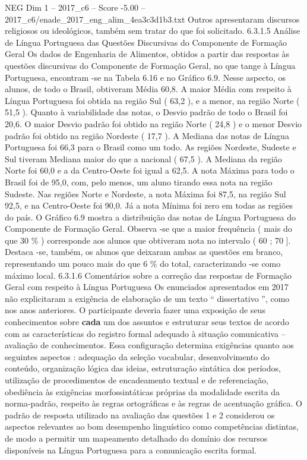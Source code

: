 \begin{textsample}{NEG Dim 1 – 2017\_c6 – Score -5.00 – 2017\_c6/enade\_2017\_eng\_alim\_4ea3c3d1b3.txt}
Outros apresentaram discursos religiosos ou ideológicos, também sem tratar do que foi solicitado. 6.3.1.5 Análise de Língua Portuguesa das Questões Discursivas do Componente de Formação Geral Os dados de Engenharia de Alimentos, obtidos a partir das respostas às questões discursivas do Componente de Formação Geral, no que tange à Língua Portuguesa, encontram -se na Tabela 6.16 e no Gráfico 6.9.
Nesse aspecto, os alunos, de todo o Brasil, obtiveram Média 60,8.
A maior Média com respeito à Língua Portuguesa foi obtida na região Sul ( 63,2 ), e a menor, na região Norte ( 51,5 ).
Quanto à variabilidade das notas, o Desvio padrão de todo o Brasil foi 20,6.
O maior Desvio padrão foi obtido na região Norte ( 24,8 ) e o menor Desvio padrão foi obtido na região Nordeste ( 17,7 ).
A Mediana das notas de Língua Portuguesa foi 66,3 para o Brasil como um todo.
As regiões Nordeste, Sudeste e Sul tiveram Mediana maior do que a nacional ( 67,5 ).
A Mediana da região Norte foi 60,0 e a da Centro-Oeste foi igual a 62,5.
A nota Máxima para todo o Brasil foi de 95,0, com, pelo menos, um aluno tirando essa nota na região Sudeste.
Nas regiões Norte e Nordeste, a nota Máxima foi 87,5, na região Sul 92,5, e na Centro-Oeste foi 90,0.
Já a nota Mínima foi zero em todas as regiões do país.
O Gráfico 6.9 mostra a distribuição das notas de Língua Portuguesa do Componente de Formação Geral.
Observa -se que a maior frequência ( mais do que 30 \% ) corresponde aos alunos que obtiveram nota no intervalo ( 60 ; 70 ].
Destaca -se, também, os alunos que deixaram ambas as questões em branco, representando um pouco mais do que 6 \% do total, caracterizando -se como máximo local. 6.3.1.6 Comentários sobre a correção das respostas de Formação Geral com respeito à Língua Portuguesa Os enunciados apresentados em 2017 não explicitaram a exigência de elaboração de um texto “ dissertativo ”, como nos anos anteriores.
O participante deveria fazer uma exposição de seus conhecimentos sobre \textbf{cada} um dos assuntos e estruturar seus textos de acordo com as características do registro formal adequado à situação comunicativa – avaliação de conhecimentos.
Essa configuração determina exigências quanto aos seguintes aspectos : adequação da seleção vocabular, desenvolvimento do conteúdo, organização lógica das ideias, estruturação sintática dos períodos, utilização de procedimentos de encadeamento textual e de referenciação, obediência às exigências morfossintáticas próprias da modalidade escrita da norma-padrão, respeito às regras ortográficas e às regras de acentuação gráfica.
O padrão de resposta utilizado na avaliação das questões 1 e 2 considerou os aspectos relevantes ao bom desempenho linguístico como competências distintas, de modo a permitir um mapeamento detalhado do domínio dos recursos disponíveis na Língua Portuguesa para a comunicação escrita formal.

\end{textsample}
